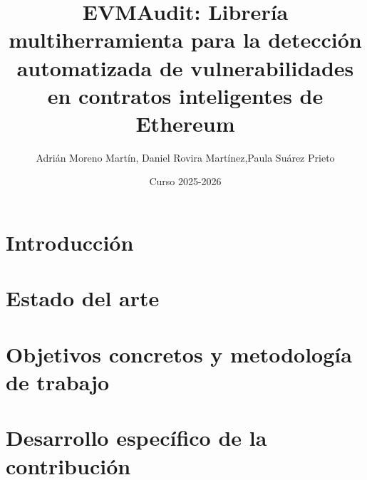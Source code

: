 \documentclass[11pt,a4paper,spanish]{book}
\title{EVMAudit: Librería multiherramienta para la detección automatizada de vulnerabilidades en contratos inteligentes de Ethereum}
\author{Adrián Moreno Martín, Daniel Rovira Martínez,Paula Suárez Prieto }
\date{Curso 2025-2026}
\numberwithin{equation}{chapter}
\numberwithin{figure}{chapter}
\begin{document}
\pagestyle{fancy}

\renewcommand{\listfigurename}{Índice de Ilustraciones}
\renewcommand{\listtablename}{Índice de Tablas}
\renewcommand{\contentsname}{Índice de Contenidos}
\renewcommand{\figurename}{Figura}
\renewcommand{\tablename}{Tabla}

\maketitle

\frontmatter








\newpage
\tableofcontents
\listoffigures
\listoftables


\mainmatter

\chapter{Introducción}


\chapter{Estado del arte}








\chapter{Objetivos concretos y metodología de trabajo}


\chapter{Desarrollo específico de la contribución}












\end{document}
